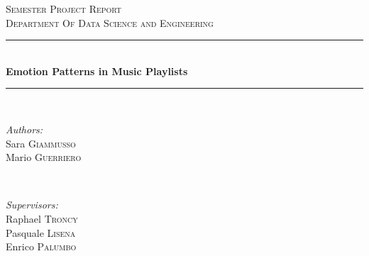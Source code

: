 \begin{titlepage}

\newcommand{\HRule}{\rule{\linewidth}{0.2mm}} %

\center %
 

\textsc{\Large Semester Project Report}\\[0.5cm] %
\textsc{\large Department Of Data Science and Engineering}\\[0.5cm] %


\HRule \\[0.4cm]
{ \Large \bfseries Emotion Patterns in Music Playlists}\\[0.4cm] %
\HRule \\[6cm]
 

\begin{minipage}{0.4\textwidth}
\begin{flushleft} \large
\emph{Authors:}\\
Sara \textsc{Giammusso} \\ Mario \textsc{Guerriero} %
\end{flushleft}
\end{minipage}
~
\begin{minipage}{0.4\textwidth}
\begin{flushright} \large
\emph{Supervisors:} \\
Raphael \textsc{Troncy}\\ Pasquale \textsc{Lisena}\\ Enrico \textsc{Palumbo} %
\end{flushright}
\end{minipage}\\[2cm]


\end{titlepage}
